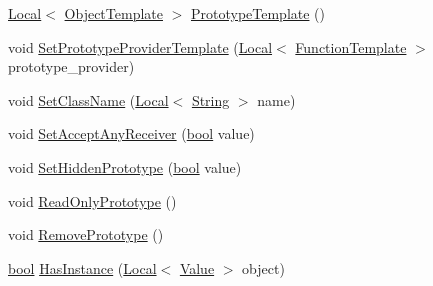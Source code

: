 \begin{DoxyCompactItemize}
\item 
\mbox{\hyperlink{classv8_1_1Local}{Local}}$<$ \mbox{\hyperlink{classv8_1_1ObjectTemplate}{Object\+Template}} $>$ \mbox{\hyperlink{classv8_1_1FunctionTemplate_a086408da7fe81f69f0d3bbcb95e83cc7}{Prototype\+Template}} ()
\item 
void \mbox{\hyperlink{classv8_1_1FunctionTemplate_abbe5fd8e3688db6dfb3793f9a48aa372}{Set\+Prototype\+Provider\+Template}} (\mbox{\hyperlink{classv8_1_1Local}{Local}}$<$ \mbox{\hyperlink{classv8_1_1FunctionTemplate}{Function\+Template}} $>$ prototype\+\_\+provider)
\item 
void \mbox{\hyperlink{classv8_1_1FunctionTemplate_a491e77dc7ceb5b0fe75880d11f2dbe9e}{Set\+Class\+Name}} (\mbox{\hyperlink{classv8_1_1Local}{Local}}$<$ \mbox{\hyperlink{classv8_1_1String}{String}} $>$ name)
\item 
void \mbox{\hyperlink{classv8_1_1FunctionTemplate_a5ffdc68d8035b02ed7583950b76ef91f}{Set\+Accept\+Any\+Receiver}} (\mbox{\hyperlink{classbool}{bool}} value)
\item 
void \mbox{\hyperlink{classv8_1_1FunctionTemplate_ade426e8a21d777ae6100e6c1aa7bfaee}{Set\+Hidden\+Prototype}} (\mbox{\hyperlink{classbool}{bool}} value)
\item 
void \mbox{\hyperlink{classv8_1_1FunctionTemplate_a91d2e0643e8c5a53ab1d75f7766c2422}{Read\+Only\+Prototype}} ()
\item 
void \mbox{\hyperlink{classv8_1_1FunctionTemplate_a4a184aca244174c7fe52d58871d3129e}{Remove\+Prototype}} ()
\item 
\mbox{\hyperlink{classbool}{bool}} \mbox{\hyperlink{classv8_1_1FunctionTemplate_a90d838f3456d300bd19d2a2cb98645bd}{Has\+Instance}} (\mbox{\hyperlink{classv8_1_1Local}{Local}}$<$ \mbox{\hyperlink{classv8_1_1Value}{Value}} $>$ object)
\end{DoxyCompactItemize}
